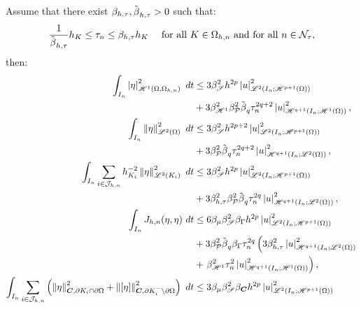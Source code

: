 \newpage
\begin{lemma} \label{lemma:bounds}
    Assume that there exist $\beta_{h, \tau}, \tilde{\beta_{}}_{h, \tau} > 0$ such that:
    \begin{align}
        \frac{1}{\tilde{\beta_{}}_{h, \tau}} h_K &\leq \tau_n \leq \beta_{h, \tau} h_K &\text{ for all } K \in \Omega_{h, n} \text{ and for all } n \in \mathcal{N}_{\tau}, \label{equation:ass_ht}
    \end{align}
    then:
    \begin{align}
        \int_{I_n} \left\lvert \eta \right\rvert_{\SpaceHk{1}(\Omega, \Omega_{h, n})}^2 ~ dt &\leq 3 \BoundInterp^2 h^{2p} \Seminorm{u}_{\SpaceLp{2}(I_n; \SpaceHk{p + 1}(\Omega))}^2 \label{eq:bound_1} \\
        &+ 3 \BoundH^2 \BoundPoly^2 \BoundQVariant \tau_n^{2q + 2} \Seminorm{u}_{\SpaceHk{q + 1}(I_n; \SpaceHk{1}(\Omega))}^2, \notag \\
        \TimeIntN{\Norm{\eta}_{\SpaceLp{2}(\Omega)}^2} & \leq 3 \BoundInterp^2 h^{2p + 2} \Seminorm{u}_{\SpaceLp{2}(I_n; \SpaceHk{p + 1}(\Omega))}^2 \label{eq:bound_2} \\
        &+ 3 \BoundPoly^2 \BoundQVariant \tau_n^{2q + 2} \Seminorm{u}_{\SpaceHk{q + 1}(I_n; \SpaceLp{2}(\Omega))}^2, \notag \\
        \TimeIntN{ \sum_{i \in \SpaceTimeIndices} h_{K_i}^{-2} \Norm{\eta}_{\SpaceLp{2}(K_i)}^2 } &\leq 3 \BoundInterp^2 h^{2p} \Seminorm{u}_{\SpaceLp{2}(I_n; \SpaceHk{p + 1}(\Omega))}^2 \label{eq:bound_3} \\
        &+  3 \BoundHT^2 \BoundPoly^2 \BoundQVariant \tau_n^{2q} \Seminorm{u}_{\SpaceHk{q + 1}(I_n; \SpaceLp{2}(\Omega))}^2, \notag \\
        \TimeIntN{J_{h, n}(\eta, \eta)} &\leq 6 \BoundTrace \BoundInterp^2 \BoundDeg h^{2p} \Seminorm{u}_{\SpaceLp{2}(I_n; \SpaceHk{p + 1}(\Omega))}^2 \label{eq:bound_4} \\
        &+ 3 \BoundPoly^2 \BoundQVariant \BoundDeg \tau_n^{2q} \left( 3 \BoundHT^2 \Seminorm{u}_{\SpaceHk{q + 1}(I_n; \SpaceLp{2}(\Omega))}^2 \right. \notag \\
        &+ \left.\BoundH^2 \tau_n^2 \Seminorm{u}_{\SpaceHk{q + 1}(I_n; \SpaceHk{1}(\Omega))}^2 \right), \notag \\
        \TimeIntN{ \sum_{i \in \SpaceTimeIndices} \left( \Norm{\eta}_{\Convection, \partial K_i \cap \partial \Omega}^2 + \Norm{\left[ \eta \right]}_{\Convection, \partial K_i^- \setminus \partial \Omega}^2 \right) } &\leq 3 \BoundTrace \BoundInterp^2 \BoundC{\Convection} h^{2p} \Seminorm{u}_{\SpaceLp{2}(I_n; \SpaceHk{p + 1}(\Omega))}^2 \label{eq:bound_5} \\

\end{align}
\end{lemma}
